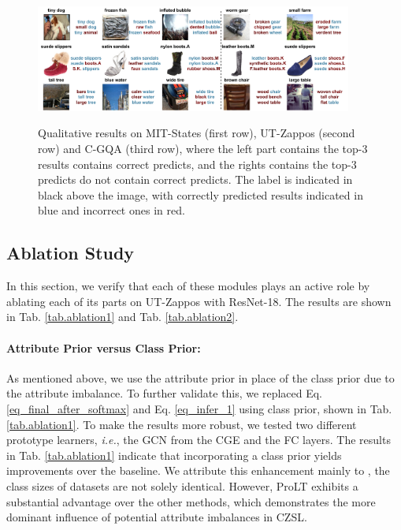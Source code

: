 \documentclass[letterpaper]{article} %
\newcommand{\ie}{\textit{i.e.}}
\theoremstyle{definition}
\begin{document}
	
 	\begin{figure}[t]
		\centering
		\subfigure
		{
			\includegraphics[width=0.93\textwidth]{ Fig_quanlity.pdf}
		}
		\caption{Qualitative results on MIT-States (first row), UT-Zappos (second row) and C-GQA (third row), where the left part contains the top-3 results contains correct predicts, and the rights contains the top-3 predicts do not contain correct predicts. The label is indicated in black above the image, with correctly predicted results indicated in blue and incorrect ones in red.}
		\label{fig_qua}
	\end{figure}
\subsection{Ablation Study} \label{subsec.ablation}
In this section, we verify that each of these modules plays an active role by ablating each of its parts on UT-Zappos with ResNet-18. The results are shown in Tab. \ref{tab.ablation1} and Tab. \ref{tab.ablation2}.
\paragraph{Attribute Prior versus Class Prior:} As mentioned above, we use the attribute prior in place of the class prior due to the attribute imbalance. To further validate this, we replaced Eq. \ref{eq_final_after_softmax} and Eq. \ref{eq_infer_1} using class prior, shown in Tab. \ref{tab.ablation1}. To make the results more robust, we tested two different prototype learners, \ie, the GCN from the CGE \cite{naeem2021learning} and the FC layers. The results in Tab. \ref{tab.ablation1} indicate that incorporating a class prior yields improvements over the baseline. We attribute this enhancement mainly to \citet{menon2020long}, the class sizes of datasets are not solely identical. However, ProLT exhibits a substantial advantage over the other methods, which demonstrates the more dominant influence of potential attribute imbalances in CZSL.
\end{document}
